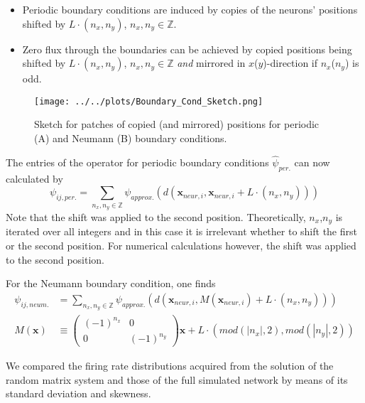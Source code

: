 \documentclass[10pt,a4paper]{article}
\begin{document}
\begin{itemize}
\item Periodic boundary conditions are induced by copies of the neurons' positions shifted by $L\cdot (n_x,n_y)$, $n_x,n_y \in \mathbb{Z}$.
\item Zero flux through the boundaries can be achieved by copied positions being shifted by $L\cdot (n_x,n_y)$, $n_x,n_y \in \mathbb{Z}$ \textit{and} mirrored in $x$($y$)-direction if $n_x$($n_y$) is odd.
\end{itemize}

\begin{figure}
\begin{center}
\texttt{[image: ../../plots/Boundary\_Cond\_Sketch.png]}
\end{center}
\caption{Sketch for patches of copied (and mirrored) positions for periodic (A) and Neumann (B) boundary conditions.}
\label{Bound_Cond_Patches}
\end{figure}

The entries of the operator for periodic boundary conditions $\hat{\psi}_{per.}$ can now calculated by
\begin{equation}
\psi_{ij,per.} = \sum_{n_x,n_y \in \mathbb{Z}} \psi_{approx.} (d(\mathbf{x}_{neur,i},\mathbf{x}_{neur,i} + L \cdot (n_x,n_y)))
\label{Psi_entries_periodic_bound}
\end{equation}
Note that the shift was applied to the second position. Theoretically, $n_x$,$n_y$ is iterated over all integers and in this case it is irrelevant whether to shift the first or the second position. For numerical calculations however, the shift was applied to the second position.

For the Neumann boundary condition, one finds
\begin{align}
\psi_{ij,neum.} &= \sum_{n_x,n_y \in \mathbb{Z}} \psi_{approx.} \left( d(\mathbf{x}_{neur,i},M(\mathbf{x}_{neur,i}) + L \cdot (n_x,n_y)) \right) \label{Psi_entries_neumann_bound} \\
M(\mathbf{x}) &\equiv  
 \begin{pmatrix}
  (-1)^{n_x} & 0\\
  0 & (-1)^{n_y}
 \end{pmatrix}
\mathbf{x} + L \cdot (mod(\left| n_x\right|,2),mod(\left| n_y\right|,2)) \label{Mirror_Operator}
\end{align}

We compared the firing rate distributions acquired from the solution of the random matrix system and those of the full simulated network by means of its standard deviation and skewness.
\end{document}
